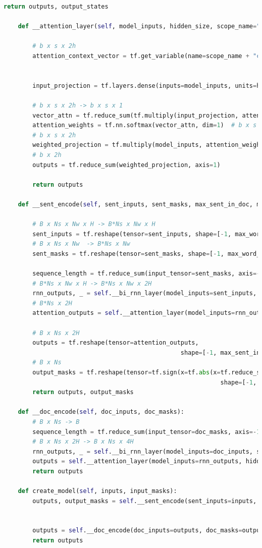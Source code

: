 \documentclass[twoside,a4paper,12pt]{book}%
\begin{document}
\begin{lstlisting}[language={Python}]
		return outputs, output_states

	def __attention_layer(self, model_inputs, hidden_size, scope_name="none"):

		# b x s x 2h
		attention_context_vector = tf.get_variable(name=scope_name + "context",
																							 shape=[hidden_size * 2],
																							 dtype=tf.float32)
		input_projection = tf.layers.dense(inputs=model_inputs, units=hidden_size * 2, activation=tf.tanh)

		# b x s x 2h -> b x s x 1
		vector_attn = tf.reduce_sum(tf.multiply(input_projection, attention_context_vector), axis=2, keep_dims=True)
		attention_weights = tf.nn.softmax(vector_attn, dim=1)  # b x s x 1
		# b x s x 2h
		weighted_projection = tf.multiply(model_inputs, attention_weights)
		# b x 2h
		outputs = tf.reduce_sum(weighted_projection, axis=1)

		return outputs

	def __sent_encode(self, sent_inputs, sent_masks, max_sent_in_doc, max_word_in_sent):

		# B x Ns x Nw x H -> B*Ns x Nw x H
		sent_inputs = tf.reshape(tensor=sent_inputs, shape=[-1, max_word_in_sent, self._config.hidden_size])
		# B x Ns x Nw  -> B*Ns x Nw
		sent_masks = tf.reshape(tensor=sent_masks, shape=[-1, max_word_in_sent])

		sequence_length = tf.reduce_sum(input_tensor=sent_masks, axis=-1)
		# B*Ns x Nw x H -> B*Ns x Nw x 2H
		rnn_outputs, _ = self.__bi_rnn_layer(model_inputs=sent_inputs, sequence_length=sequence_length, scope_name='sent')
		# B*Ns x 2H
		attention_outputs = self.__attention_layer(model_inputs=rnn_outputs, hidden_size=self._config.hidden_size, scope_name='sent')

		# B x Ns x 2H
		outputs = tf.reshape(tensor=attention_outputs,
												 shape=[-1, max_sent_in_doc, self._config.hidden_size*2])
		# B x Ns
		output_masks = tf.reshape(tensor=tf.sign(x=tf.abs(x=tf.reduce_sum(input_tensor=sent_masks, axis=-1))),
															shape=[-1, max_sent_in_doc])
		return outputs, output_masks

	def __doc_encode(self, doc_inputs, doc_masks):
		# B x Ns -> B
		sequence_length = tf.reduce_sum(input_tensor=doc_masks, axis=-1)
		# B x Ns x 2H -> B x Ns x 4H
		rnn_outputs, _ = self.__bi_rnn_layer(model_inputs=doc_inputs, sequence_length=sequence_length, scope_name="doc")
		outputs = self.__attention_layer(model_inputs=rnn_outputs, hidden_size=2*self._config.hidden_size, scope_name="doc")
		return outputs

	def create_model(self, inputs, input_masks):
		outputs, output_masks = self.__sent_encode(sent_inputs=inputs, sent_masks=input_masks,
											 													max_word_in_sent=self._config.max_word_in_sent,
											 													max_sent_in_doc=self._config.max_sent_in_doc)
		outputs = self.__doc_encode(doc_inputs=outputs, doc_masks=output_masks)
		return outputs
\end{lstlisting}
\end{document}
